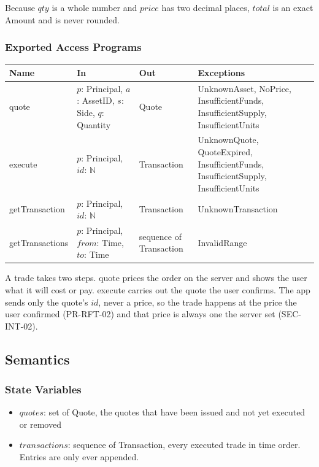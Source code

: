 \documentclass[12pt, titlepage]{article}
\begin{document}
\noindent Because $\mathit{qty}$ is a whole number and $\mathit{price}$ has
two decimal places, $\mathit{total}$ is an exact Amount and is never rounded.

\subsubsection{Exported Access Programs}

\begin{center}
\renewcommand{\arraystretch}{1.2}
\begin{tabular}{>{\raggedright\arraybackslash}p{2.6cm}
  >{\raggedright\arraybackslash}p{4.6cm}
  >{\raggedright\arraybackslash}p{2.8cm}
  >{\raggedright\arraybackslash}p{4cm}}
\toprule
\textbf{Name} & \textbf{In} & \textbf{Out} & \textbf{Exceptions} \\
\midrule
quote & $p$: Principal, $a$: AssetID, $s$: Side, $q$: Quantity & Quote &
  UnknownAsset, NoPrice, InsufficientFunds, InsufficientSupply,
  InsufficientUnits \\
execute & $p$: Principal, $\mathit{id}$: $\mathbb{N}$ & Transaction &
  UnknownQuote, QuoteExpired, InsufficientFunds, InsufficientSupply,
  InsufficientUnits \\
getTransaction & $p$: Principal, $\mathit{id}$: $\mathbb{N}$ & Transaction &
  UnknownTransaction \\
getTransactions & $p$: Principal, $\mathit{from}$: Time, $\mathit{to}$: Time
  & sequence of Transaction & InvalidRange \\
\bottomrule
\end{tabular}
\end{center}

\noindent A trade takes two steps. quote prices the order on the server and
shows the user what it will cost or pay. execute carries out the quote the
user confirms. The app sends only the quote's $\mathit{id}$, never a price,
so the trade happens at the price the user confirmed (PR-RFT-02) and that
price is always one the server set (SEC-INT-02).

\subsection{Semantics}

\subsubsection{State Variables}

\begin{itemize}
\item $\mathit{quotes}$: set of Quote, the quotes that have been issued and
  not yet executed or removed
\item $\mathit{transactions}$: sequence of Transaction, every executed trade
  in time order. Entries are only ever appended.
\end{itemize}
\end{document}
